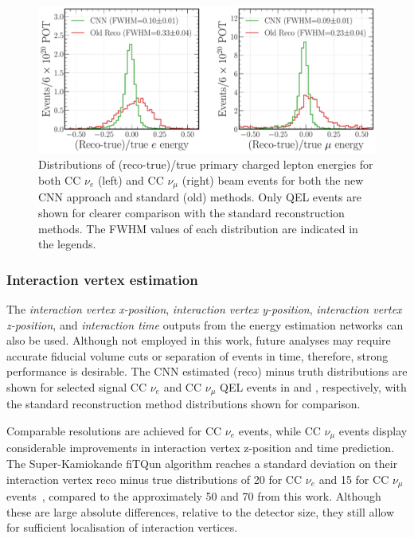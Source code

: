 \begin{figure} %
    \includegraphics[width=\textwidth]{diagrams/7-results/final_frac_e_comparison.pdf}
    \caption[Distributions of (reco-true)/true primary charged lepton energies for the CNN and
        standard methods] {Distributions of (reco-true)/true primary charged lepton energies for
        both CC $\nu_{e}$ (left) and CC $\nu_{\mu}$ (right) beam events for both the new CNN
        approach and standard (old) methods. Only QEL events are shown for clearer comparison with
        the standard reconstruction methods. The FWHM values of each distribution are indicated in
        the legends.}
    \label{fig:final_frac_e_comparison}
\end{figure}

\subsubsection*{Interaction vertex estimation} %

The \emph{interaction vertex x-position}, \emph{interaction vertex y-position}, \emph{interaction
    vertex z-position}, and \emph{interaction time} outputs from the energy estimation networks
    can also be used. Although not employed in this work, future analyses may require accurate
    fiducial volume cuts or separation of events in time, therefore, strong performance is
    desirable. The CNN estimated (reco) minus truth distributions are shown for selected signal CC
    $\nu_{e}$ and CC $\nu_{\mu}$ QEL events in 
    and , respectively, with the standard
    reconstruction method distributions shown for comparison.

Comparable resolutions are achieved for CC $\nu_{e}$ events, while CC $\nu_{\mu}$ events display
considerable improvements in interaction vertex z-position and time prediction. The
Super-Kamiokande fiTQun algorithm reaches a standard deviation on their interaction vertex reco
minus true distributions of \SI{20}{} for CC $\nu_{e}$ and \SI{15}{} for CC
$\nu_{\mu}$ events~\cite{jiang2019}, compared to the approximately \SI{50}{} and
\SI{70}{} from this work. Although these are large absolute differences, relative to the
detector size, they still allow for sufficient localisation of interaction vertices.

